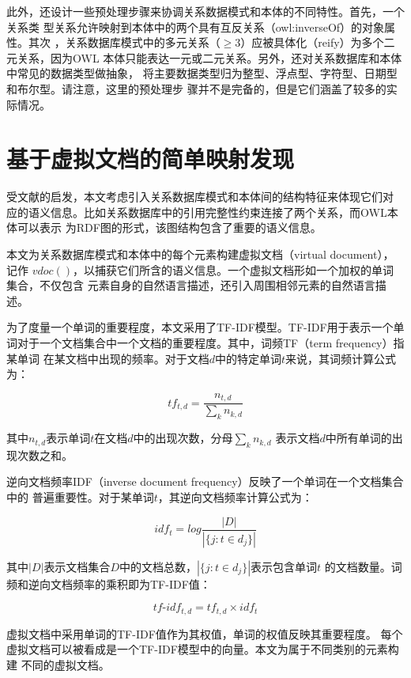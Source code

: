 此外，还设计一些预处理步骤来协调关系数据模式和本体的不同特性。首先，一个关系类
型关系允许映射到本体中的两个具有互反关系（owl:inverseOf）的对象属性。其次
，关系数据库模式中的多元关系（$\ge3$）应被具体化（reify）为多个二元关系，因为OWL
本体只能表达一元或二元关系。另外，还对关系数据库和本体中常见的数据类型做抽象，
将主要数据类型归为整型、浮点型、字符型、日期型和布尔型。请注意，这里的预处理步
骤并不是完备的，但是它们涵盖了较多的实际情况。

\section{基于虚拟文档的简单映射发现}
\label{2:2}
受文献\cite{15}的启发，本文考虑引入关系数据库模式和本体间的结构特征来体现它们对
应的语义信息。比如关系数据库中的引用完整性约束连接了两个关系，而OWL本体可以表示
为RDF图的形式，该图结构包含了重要的语义信息。

本文为关系数据库模式和本体中的每个元素构建虚拟文档（virtual document），记作
$vdoc()$，以捕获它们所含的语义信息。一个虚拟文档形如一个加权的单词集合，不仅包含
元素自身的自然语言描述，还引入周围相邻元素的自然语言描述。

为了度量一个单词的重要程度，本文采用了TF-IDF模型\cite{32}。TF-IDF用于表示一个单
词对于一个文档集合中一个文档的重要程度。其中，词频TF（term frequency）指某单词
在某文档中出现的频率。对于文档$d$中的特定单词$t$来说，其词频计算公式为：

\begin{equation}
tf_{t,d} = \frac{n_{t,d}}{\sum_{k}n_{k,d}}
\end{equation}

其中$n_{t,d}$表示单词$t$在文档$d$中的出现次数，分母$\sum_{k}n_{k,d}$
表示文档$d$中所有单词的出现次数之和。

逆向文档频率IDF（inverse document frequency）反映了一个单词在一个文档集合中的
普遍重要性。对于某单词$t$，其逆向文档频率计算公式为：

\begin{equation}
idf_t = log \frac{|D|}{|\{j:t \in d_j\}|} 
\end{equation}

其中$|D|$表示文档集合$D$中的文档总数，$|\{j:t \in d_j\}|$表示包含单词$t$
的文档数量。词频和逆向文档频率的乘积即为TF-IDF值：

\begin{equation}
tf\textrm{-}idf_{t,d} = tf_{t,d} \times idf_t
\end{equation}

虚拟文档中采用单词的TF-IDF值作为其权值，单词的权值反映其重要程度。
每个虚拟文档可以被看成是一个TF-IDF模型中的向量。本文为属于不同类别的元素构建
不同的虚拟文档。

